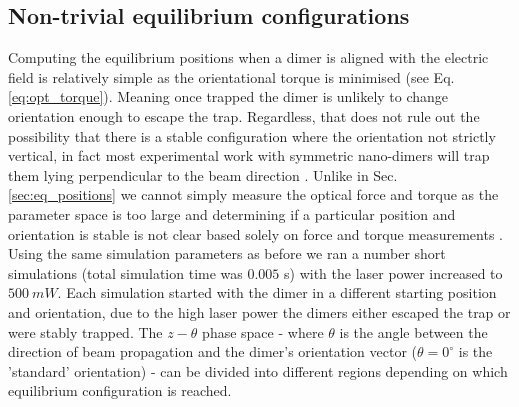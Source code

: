 \newpage
\subsection{Non-trivial equilibrium configurations}
\label{sec:off-axis}
Computing the equilibrium positions when a dimer is aligned 
with the electric field is relatively simple as the orientational 
torque is minimised (see Eq.\ref{eq:opt_torque}). Meaning once 
trapped the dimer is unlikely to change orientation enough to 
escape the trap. Regardless, that does not rule out the 
possibility that there is a stable configuration where the 
orientation not strictly vertical, in fact most experimental 
work with symmetric nano-dimers will trap them lying perpendicular 
to the beam direction \cite{Ahn2018, Reimann2018}. Unlike in Sec.~
\ref{sec:eq_positions} we cannot simply measure the optical force 
and torque as the parameter space is too large and determining if 
a particular position and orientation is stable is not clear based 
solely on force and torque measurements \cite{Bui2017}. Using the 
same simulation parameters as before we ran a number short 
simulations (total simulation time was $0.005$ s) with the laser 
power increased to $500\ mW$. Each simulation started with the 
dimer in a different starting position and orientation, due to the 
high laser power the dimers either escaped the trap or were stably 
trapped. The $z-\theta$ phase space - where $\theta$ is the angle 
between the direction of beam propagation and the dimer's orientation 
vector ($\theta=0^\circ$ is the 'standard' orientation) - can be 
divided into different regions depending on which equilibrium 
configuration is reached.
